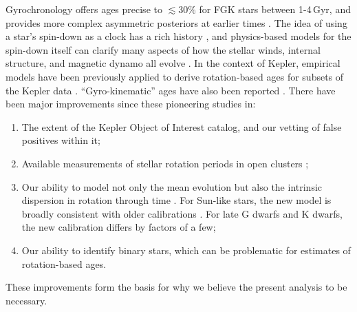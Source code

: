 \documentclass[11pt,twocolumn,tighten]{aastex63}
\begin{document}
Gyrochronology offers ages precise to $\lesssim$30\% for FGK stars
between 1-4\,Gyr, and provides more complex asymmetric posteriors at earlier
times \citep{Bouma_2023}.  The idea of using a star's spin-down as a
clock has a rich history
\citep{Skumanich_1972,Noyes_1984,Kawaler_1989,Barnes03,Mamajek_2008,Angus_2015},
and physics-based models for the spin-down itself can clarify many
aspects of how the stellar winds, internal structure, and magnetic
dynamo all evolve
\citep[e.g.][]{Matt_2015,Gallet_Bouvier_2015,Spada_2020}.  In the
context of Kepler, empirical models have been previously applied to
derive rotation-based ages for subsets of the Kepler data
\citep{Walkowicz_2013,Reinhold_2015,Angus_2018}.  ``Gyro-kinematic'' ages
have also been reported \citep{2021AJ....161..189L}.
There have been
major improvements since these pioneering studies in:
\begin{enumerate}[label={\it \roman*)},leftmargin=*,topsep=0pt,itemsep=-1ex,partopsep=1ex,parsep=1ex]
  \item The extent of the Kepler Object of Interest catalog, and our vetting of false
    positives within it;
  \item Available measurements of stellar rotation periods
    in open clusters
    \citep[e.g.][]{Curtis_2019_ngc6811,Gillen_2020,Rampalli_2021,Fritzewski_2021,Rebull_2022,Dungee_2022,2023AJ....166...14B};
  \item Our ability to model not only the mean evolution but also the
    intrinsic dispersion in rotation through time
    \citep{Bouma_2023}.  For Sun-like stars, the new model is broadly
    consistent with older calibrations \citep[e.g.][]{Mamajek_2008}.
    For late G dwarfs and K dwarfs, the new calibration
    differs by factors of a few;
  \item Our ability to identify binary stars, which can be problematic
    for estimates of rotation-based ages.
\end{enumerate}
These improvements form the basis for why we believe the present
analysis to be necessary.
\end{document}
